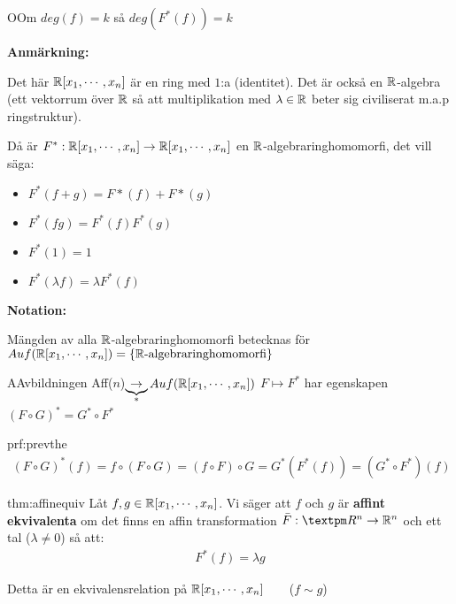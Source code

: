 \par\bigskip
\begin{theo}
  OOm $deg(f) =k$ så $deg(F^*(f))=k$
\end{theo}
\par\bigskip
\noindent\textbf{Anmärkning:}\par
\noindent Det här $\mathbb{R}[x_1,\cdots,x_n]$ är en ring med $1$:a (identitet). Det är också en $\mathbb{R}$-algebra (ett vektorrum över $\mathbb{R}$ så att multiplikation med $\lambda\in\mathbb{R}$ beter sig civiliserat m.a.p ringstruktur).
\par\bigskip
\noindent Då är $F^*:\mathbb{R}[x_1,\cdots,x_n]\to\mathbb{R}[x_1,\cdots,x_n]$ en $\mathbb{R}$-algebraringhomomorfi, det vill säga:
\begin{itemize}
  \item $F^*(f+g) = F*(f)+F*(g)$
  \item $F^*(fg) = F^*(f)F^*(g)$
  \item $F^*(1) = 1$
  \item $F^*(\lambda f) = \lambda F^*(f)$
\end{itemize}
\par\bigskip
\noindent\textbf{Notation:}\par
\noindent Mängden av alla $\mathbb{R}$-algebraringhomomorfi betecknas för $Auf(\mathbb{R}[x_1,\cdots,x_n]) = \{\mathbb{R}\text{-algebraringhomomorfi}\}$
\par\bigskip
\begin{theo}
  AAvbildningen Aff($n$)$\underbrace{\to}_{\text{*}}Auf(\mathbb{R}[x_1,\cdots,x_n])$ $F\mapsto F^*$ har egenskapen $(F\circ G)^* = G^*\circ F^*$
\end{theo}
\par\bigskip
\begin{prf}{prf:prevthe}
  \begin{equation*}
    \begin{gathered}
      (F\circ G)^*(f) = f\circ (F\circ G) = (f\circ F)\circ G = G^*(F^*(f)) = (G^*\circ F^*)(f)
    \end{gathered}
  \end{equation*}
\end{prf}
\par\bigskip
\begin{theo}{thm:affinequiv}
  Låt $f,g\in\mathbb{R}[x_1,\cdots,x_n]$. Vi säger att $f$ och $g$ är \textbf{affint ekvivalenta} om det finns en affin transformation $\bar{F}:±R^n\to\R^n$ och ett tal ($\lambda\neq0$) så att:
  \begin{equation*}
    \begin{gathered}
      F^*(f) = \lambda g
    \end{gathered}
  \end{equation*}
  \par\bigskip
  \noindent Detta är en ekvivalensrelation på $\mathbb{R}[x_1,\cdots,x_n]$$\qquad$($f\sim g$)
\end{theo}
\newpage

